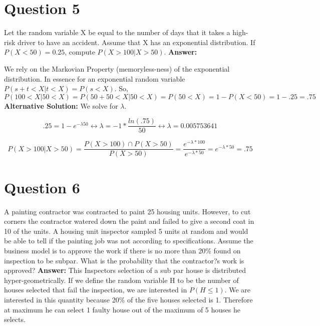 \documentclass[svgnames]{article}
\begin{document}
\section{Question 5}
Let the random variable X be equal to the number of days that it takes a high-risk driver to
have an accident. Assume that X has an exponential distribution. If $P(X<50) = 0.25$, compute
$P(X>100|X>50)$.
\newline
\newline
\textbf{Answer:}

We rely on the Markovian Property (memoryless-ness) of the exponential distribution. In essence for an exponential random variable $P(s+t < X | t < X ) =P(s < X )$.
\newline
So,
$$P(100< X | 50 < X ) = P(50+50 < X | 50 < X ) =P(50 < X ) = 1 - P( X < 50)=1-.25=.75 $$
\newline
\newline
\newline
\textbf{Alternative Solution:}
\newline
We solve for $\lambda$.

$$.25 = 1- e^{-\lambda 50} \leftrightarrow \lambda = -1* \frac{ln(.75)}{50} \leftrightarrow \lambda =  0.005753641$$

$$ P(X>100|X>50)= \frac{P(X>100)\cap P(X>50)}{P(X>50)} = \frac{e^{-\lambda* 100}}{e^{-\lambda* 50}}=e^{-\lambda* 50} = .75$$

\section{Question 6}
A painting contractor was contracted to paint 25 housing units. However, to cut corners the
contractor watered down the paint and failed to give a second coat in 10 of the units. A housing
unit inspector sampled 5 units at random and would be able to tell if the painting job was not
according to specifications. Assume the business model is to approve the work if there is no
more than 20\% found on inspection to be subpar. What is the probability that the contractor?s
work is approved?
\newline
\newline
\textbf{Answer:}
This Inspectors selection of a sub par house is distributed hyper-geometrically. If we define the random variable H to be the number of houses selected that fail the inspection, we are interested in $P(H\leq1)$.
\newline
\newline
We are interested in this quantity because 20\% of the five houses selected is 1. Therefore at maximum he can select 1 faulty house out of the maximum of 5 houses he selects.
\end{document}
